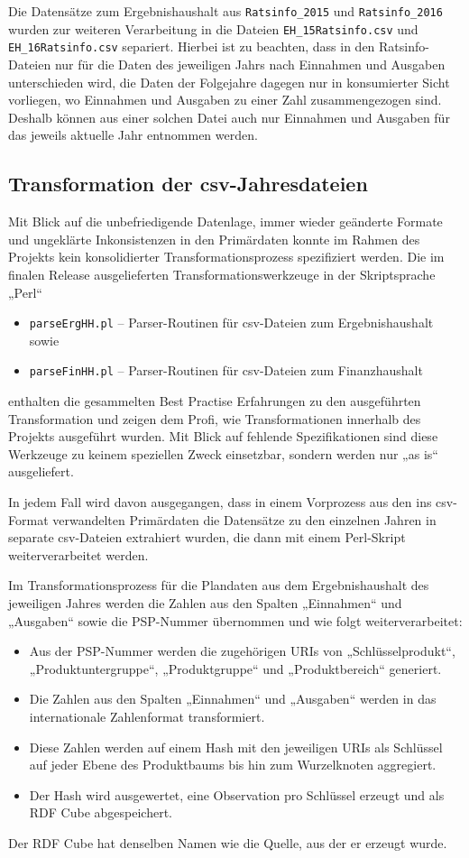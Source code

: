 \documentclass[a4paper,11pt,twoside]{article}
\begin{document}
Die Datensätze zum Ergebnishaushalt aus \texttt{Ratsinfo\_2015} und
\texttt{Ratsinfo\_2016} wurden zur weiteren Verarbeitung
  in die Dateien \texttt{EH\_15Ratsinfo.csv} und \texttt{EH\_16Ratsinfo.csv}
separiert.  Hierbei ist zu beachten, dass in den Ratsinfo-Dateien nur für die
Daten des jeweiligen Jahrs nach Einnahmen und Ausgaben unterschieden wird, die
Daten der Folgejahre dagegen nur in konsumierter Sicht vorliegen, wo Einnahmen
und Ausgaben zu einer Zahl zusammengezogen sind.  Deshalb können aus einer
solchen Datei auch nur Einnahmen und Ausgaben für das jeweils aktuelle Jahr
entnommen werden.

\subsection{Transformation der csv-Jahresdateien}

Mit Blick auf die unbefriedigende Datenlage, immer wieder geänderte Formate und
ungeklärte Inkonsistenzen in den Primärdaten konnte im Rahmen des Projekts kein
konsolidierter Transformationsprozess spezifiziert werden.  Die im finalen
Release ausgelieferten Transformationswerkzeuge in der Skriptsprache „Perl“
\begin{itemize}
\item \texttt{parseErgHH.pl} -- Parser-Routinen für csv-Dateien zum
  Ergebnishaushalt sowie 
\item \texttt{parseFinHH.pl} -- Parser-Routinen für csv-Dateien zum
  Finanzhaushalt 
\end{itemize}
enthalten die gesammelten Best Practise Erfahrungen zu den ausgeführten
Transformation und zeigen dem Profi, wie Transformationen innerhalb des
Projekts ausgeführt wurden.   Mit Blick auf fehlende Spezifikationen sind diese
Werkzeuge zu keinem speziellen Zweck einsetzbar, sondern werden nur „as is“
ausgeliefert.  

In jedem Fall wird davon ausgegangen, dass in einem Vorprozess aus den ins
csv-Format verwandelten Primärdaten die Datensätze zu den einzelnen Jahren in
separate csv-Dateien extrahiert wurden, die dann mit einem Perl-Skript
weiterverarbeitet werden.

Im Transformationsprozess für die Plandaten aus dem Ergebnishaushalt des
jeweiligen Jahres werden die Zahlen aus den Spalten „Einnahmen“ und „Ausgaben“
sowie die PSP-Nummer übernommen und wie folgt weiterverarbeitet: 
\begin{itemize}
\item Aus der PSP-Nummer werden die zugehörigen URIs von „Schlüsselprodukt“,
  „Produktuntergruppe“, „Produktgruppe“ und „Produktbereich“ generiert.
\item Die Zahlen aus den Spalten „Einnahmen“ und „Ausgaben“ werden in das
  internationale Zahlenformat transformiert.
\item Diese Zahlen werden auf einem Hash mit den jeweiligen URIs als Schlüssel
  auf jeder Ebene des Produktbaums bis hin zum Wurzelknoten aggregiert.
\item Der Hash wird ausgewertet, eine Observation pro Schlüssel erzeugt und als
  RDF Cube abgespeichert.
\end{itemize}
Der RDF Cube hat denselben Namen wie die Quelle, aus der er erzeugt wurde.  
\end{document}
